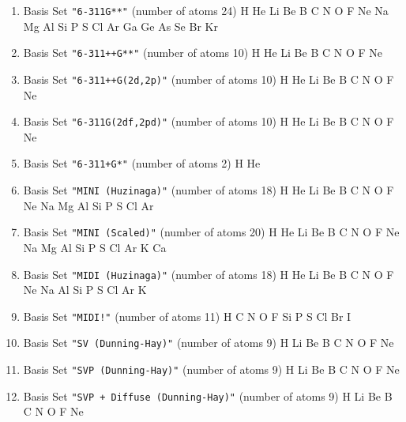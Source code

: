 \begin{enumerate}
\item Basis Set \verb#"6-311G**"# (number of atoms 24)  \newline 
  H He Li Be B C N O F Ne Na Mg Al Si P S Cl Ar Ga Ge As Se Br Kr


\item Basis Set \verb#"6-311++G**"# (number of atoms 10)  \newline 
  H He Li Be B C N O F Ne


\item Basis Set \verb#"6-311++G(2d,2p)"# (number of atoms 10)  \newline 
  H He Li Be B C N O F Ne


\item Basis Set \verb#"6-311G(2df,2pd)"# (number of atoms 10)  \newline 
  H He Li Be B C N O F Ne


\item Basis Set \verb#"6-311+G*"# (number of atoms 2)  \newline 
  H He


\item Basis Set \verb#"MINI (Huzinaga)"# (number of atoms 18)  \newline 
  H He Li Be B C N O F Ne Na Mg Al Si P S Cl Ar


\item Basis Set \verb#"MINI (Scaled)"# (number of atoms 20)  \newline 
  H He Li Be B C N O F Ne Na Mg Al Si P S Cl Ar K Ca


\item Basis Set \verb#"MIDI (Huzinaga)"# (number of atoms 18)  \newline 
  H He Li Be B C N O F Ne Na Al Si P S Cl Ar K


\item Basis Set \verb#"MIDI!"# (number of atoms 11)  \newline 
  H C N O F Si P S Cl Br I


\item Basis Set \verb#"SV (Dunning-Hay)"# (number of atoms 9)  \newline 
  H Li Be B C N O F Ne


\item Basis Set \verb#"SVP (Dunning-Hay)"# (number of atoms 9)  \newline 
  H Li Be B C N O F Ne


\item Basis Set \verb#"SVP + Diffuse (Dunning-Hay)"# (number of atoms 9)  \newline 
  H Li Be B C N O F Ne



\end{enumerate}
